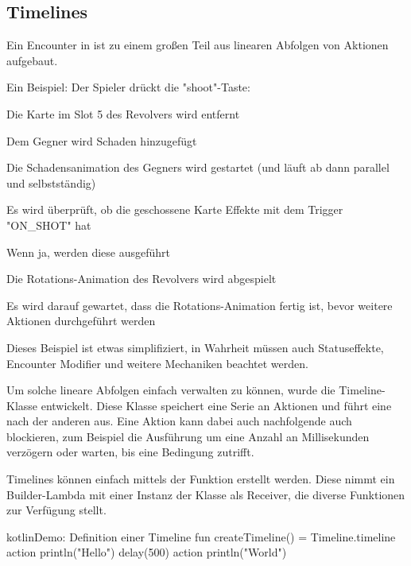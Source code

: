 
\subsection{Timelines}\label{subsec:timelines}

\renewcommand{\kapitelautor}{Autor: Marvin Kurka}

Ein Encounter in \FF ist zu einem großen Teil aus linearen Abfolgen von Aktionen aufgebaut.

Ein Beispiel: Der Spieler drückt die "shoot"-Taste:
\begin{liste}
    \setlength\itemsep{0.2em}
    \item Die Karte im Slot 5 des Revolvers wird entfernt
    \item Dem Gegner wird Schaden hinzugefügt
    \item Die Schadensanimation des Gegners wird gestartet (und läuft ab dann parallel und selbstständig)
    \item Es wird überprüft, ob die geschossene Karte Effekte mit dem Trigger "ON\_SHOT" hat
    \item Wenn ja, werden diese ausgeführt
    \item Die Rotations-Animation des Revolvers wird abgespielt
    \item Es wird darauf gewartet, dass die Rotations-Animation fertig ist, bevor weitere Aktionen durchgeführt werden
\end{liste}

Dieses Beispiel ist etwas simplifiziert, in Wahrheit müssen auch Statuseffekte, Encounter Modifier und weitere Mechaniken
beachtet werden.

Um solche lineare Abfolgen einfach verwalten zu können, wurde die Timeline-Klasse entwickelt.
Diese Klasse speichert eine Serie an Aktionen und führt eine nach der anderen aus.
Eine Aktion kann dabei auch nachfolgende auch blockieren, zum Beispiel die Ausführung um eine Anzahl an
Millisekunden verzögern oder warten, bis eine Bedingung zutrifft.

Timelines können einfach mittels der  Funktion erstellt werden.
Diese nimmt ein Builder-Lambda mit einer Instanz der  Klasse als Receiver, die
diverse Funktionen zur Verfügung stellt.

\begin{codeBlock}{kotlin}{Demo: Definition einer Timeline}
fun createTimeline() = Timeline.timeline {
    action {
        println("Hello")
    }
    delay(500)
    action {
        println("World")
    }
}
\end{codeBlock}

